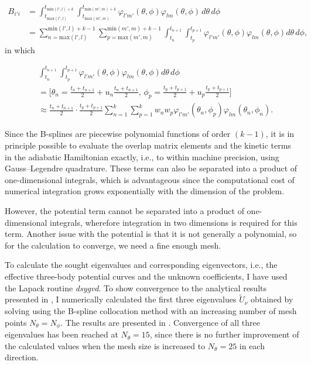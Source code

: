 \begin{equation}
\begin{aligned}
B_{i'i} &= \int_{t_{\text{max}(l',l)}}^{t_{\text{min}(l',l)+k}} \int_{t_{\text{max}(m',m)}}^{t_{\text{min}(m',m)+k}} \varphi_{l'm'}(\theta,\phi)\varphi_{lm}(\theta,\phi)\,d\theta\,d\phi \\
&= \sum_{n={\text{max}(l',l)}}^{\text{min}(l',l)+k-1} \sum_{p={\text{max}(m',m)}}^{\text{min}(m',m)+k-1} \int_{t_{n}}^{t_{n+1}} \int_{t_{p}}^{t_{p+1}} \varphi_{l'm'}(\theta,\phi) \varphi_{lm}(\theta,\phi) d\theta\,d\phi,
\end{aligned}
\end{equation}
in which

\begin{equation}
\begin{aligned}
&\int_{t_{n}}^{t_{n+1}} \int_{t_{p}}^{t_{p+1}} \varphi_{l'm'}(\theta,\phi) \varphi_{lm}(\theta,\phi) d\theta\,d\phi\,\\
&=\bigg[\theta_n = \frac{t_n + t_{n+1}}{2} + u_n\frac{t_n + t_{n+1}}{2}, \, \phi_p = \frac{t_p + t_{p+1}}{2} + u_p\frac{t_p + t_{p+1}}{2}\bigg]\\
&\approx \frac{t_n + t_{n+1}}{2} \cdot \frac{t_p + t_{p+1}}{2} \sum_{n=1}^{k}\sum_{p=1}^{k}w_n w_p \varphi_{l'm'}(\theta_n,\phi_p) \varphi_{lm}(\theta_n,\phi_n).
\end{aligned}
\end{equation}

Since the B-splines are piecewise polynomial functions of order $(k-1)$, it is in principle possible to evaluate the overlap matrix elements and the kinetic terms in the adiabatic Hamiltonian exactly, i.e., to within machine precision, using Gauss--Legendre quadrature. These terms can also be separated into a product of one-dimensional integrals, which is advantageous since the computational cost of numerical integration grows exponentially with the dimension of the problem.

However, the potential term cannot be separated into a product of one-dimensional integrals, wherefore integration in two dimensions is required for this term. Another issue with the potential is that it is not generally a polynomial, so for the calculation to converge, we need a fine enough mesh. 

To calculate the sought eigenvalues and corresponding eigenvectors, i.e., the effective three-body potential curves and the unknown coefficients, I have used the Lapack routine \textit{dsygvd}. To show convergence to the analytical results presented in , I numerically calculated the first three eigenvalues $\tilde{U}_{\nu}$ obtained by solving  using the B-spline collocation method with an increasing number of mesh points $N_{\theta}=N_{\phi}$. The results are presented in . Convergence of all three eigenvalues has been reached at $N_{\theta}=15$, since there is no further improvement of the calculated values when the mesh size is increased to $N_{\theta}=25$ in each direction.

